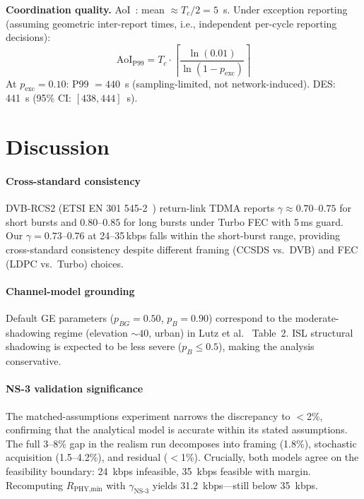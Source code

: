 \documentclass[journal]{IEEEtran}
\begin{document}
\textbf{Coordination quality.} AoI~\cite{kaul_aoi, yates_aoi}: mean $\approx T_c/2 = 5$~s. Under exception reporting (assuming geometric inter-report times, i.e., independent per-cycle reporting decisions):
\begin{equation}
    \text{AoI}_{\text{P99}} = T_c \cdot \left\lceil \frac{\ln(0.01)}{\ln(1 - p_{\text{exc}})} \right\rceil
    \label{eq:aoi_analytic}
\end{equation}
At $p_{\text{exc}} = 0.10$: P99 $= 440$~s (sampling-limited, not network-induced). DES: 441~s (95\% CI: $[438, 444]$~s).

\section{Discussion}

\paragraph{Cross-standard consistency}
DVB-RCS2 (ETSI EN 301 545-2~\cite{dvb_rcs2}) return-link TDMA reports $\gamma \approx 0.70$--$0.75$ for short bursts and $0.80$--$0.85$ for long bursts under Turbo FEC with 5\,ms guard. Our $\gamma = 0.73$--$0.76$ at 24--35\,kbps falls within the short-burst range, providing cross-standard consistency despite different framing (CCSDS vs.\ DVB) and FEC (LDPC vs.\ Turbo) choices.

\paragraph{Channel-model grounding}
Default GE parameters ($p_{BG}{=}0.50$, $p_B{=}0.90$) correspond to the moderate-shadowing regime (elevation ${\sim}40$\textdegree, urban) in Lutz et al.~\cite{lutz_1991} Table~2. ISL structural shadowing is expected to be less severe ($p_B \leq 0.5$), making the analysis conservative.

\paragraph{NS-3 validation significance}
The matched-assumptions experiment narrows the discrepancy to $<$2\%, confirming that the analytical model is accurate within its stated assumptions. The full 3--8\% gap in the realism run decomposes into framing (1.8\%), stochastic acquisition (1.5--4.2\%), and residual ($<$1\%). Crucially, both models agree on the feasibility boundary: 24~kbps infeasible, 35~kbps feasible with margin. Recomputing $R_{\text{PHY,min}}$ with $\gamma_{\text{NS-3}}$ yields 31.2~kbps---still below 35~kbps.
\end{document}
